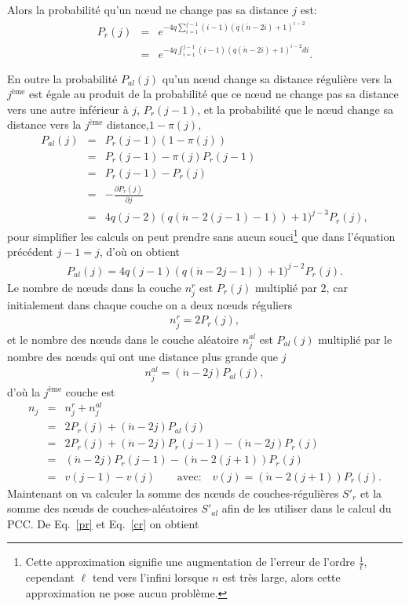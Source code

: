 Alors la probabilité qu'un nœud ne change pas sa distance $j$ est: 
\begin{eqnarray}
\label{pr}
P_r(j)&=& e^{-4q\sum_{i=1}^{j-1}(i-1)(q(\acute{n}-2i)+1)^{i-2}}\\\nonumber
&=&e^{-4q\int_{i=1}^{j-1}(i-1)(q(\acute{n}-2i)+1)^{i-2}di}.
\end{eqnarray}

En outre la probabilité $P_{al}(j)$ qu'un nœud change sa distance régulière vers la  $j^{\text{ème}}$ est égale au produit de la probabilité que ce nœud ne change pas sa distance vers une autre inférieur à  $j$, $P_r(j-1)$, et la probabilité que le nœud change sa distance vers la $j^{\text{ème}}$ distance,$1-\pi(j)$,
\begin{eqnarray}\nonumber
P_{al}(j)&=&P_r(j-1)(1-\pi(j))\\\nonumber
&=&P_r(j-1)-\pi(j)P_r(j-1)\\\nonumber
&=&P_r(j-1)-P_r(j)\\\nonumber
&=&-\frac{\partial P_r(j)}{\partial j}\\
&=&4q(j-2)(q(\acute{n}-2(j-1)-1))+1)^{j-3}P_r(j),
\end{eqnarray}
pour simplifier les calculs on peut prendre sans aucun souci\footnote{Cette approximation signifie une augmentation de l'erreur de l'ordre $\frac{1}{\ell}$, cependant $\ell$ tend vers l'infini lorsque $n$ est très large, alors cette approximation ne pose aucun problème.} que dans l'équation précédent $j-1=j$, d'où on obtient
\begin{eqnarray}
P_{al}(j)=4q(j-1)(q(\acute{n}-2j-1))+1)^{j-2}P_r(j).
\label{pal}
\end{eqnarray}
Le nombre de nœuds dans la couche $n_{j}^r$ est $P_r(j)$ multiplié par $2$, car initialement dans chaque couche on a  deux nœuds réguliers
\begin{eqnarray}
n_{j}^r=2P_r(j),
\label{cr}
\end{eqnarray}
et le nombre des nœuds dans le couche aléatoire $n_{j}^{al}$ est $P_{al}(j)$ multiplié par le nombre des nœuds qui ont une distance plus grande que $j$
\begin{eqnarray}
n_{j}^{al}=(\acute{n}-2j)P_{al}(j),
\label{cal}
\end{eqnarray}
d'où la $j^{\text{ème}}$ couche est
\begin{eqnarray}
n_j&=&n_{j}^{r}+n_{j}^{al}\\\nonumber
&=&2P_r(j)+(\acute{n}-2j)P_{al}(j)\\\nonumber
&=&2P_r(j)+(\acute{n}-2j)P_r(j-1)-(\acute{n}-2j)P_r(j)\\\nonumber
&=&(\acute{n}-2j)P_r(j-1)-(\acute{n}-2(j+1))P_r(j)\\\nonumber
&=&v(j-1)-v(j) \quad \quad  \text{avec:} \quad v(j)=(\acute{n}-2(j+1))P_r(j).
\nonumber
\label{c}
\end{eqnarray}
Maintenant on va calculer la somme des nœuds de couches-régulières $S'_r$ et la somme des nœuds de couches-aléatoires $S'_{al}$ afin de les utiliser dans le calcul du PCC. De Eq.~\eqref{pr} et Eq.~\eqref{cr} on obtient

